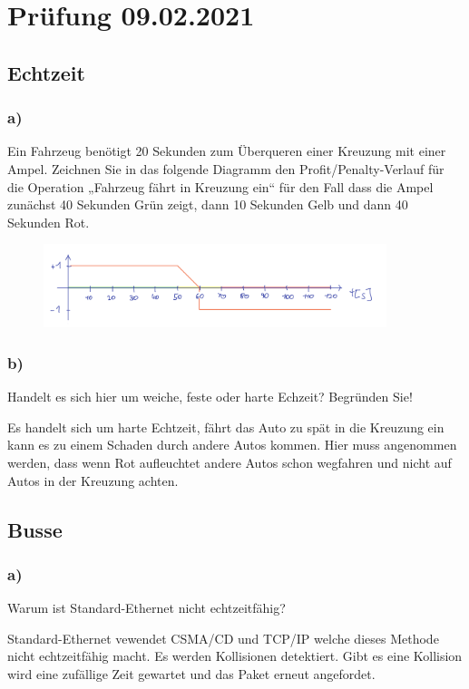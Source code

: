 \section{Prüfung 09.02.2021}
\subsection{Echtzeit}
\subsubsection{a)}
Ein Fahrzeug benötigt 20 Sekunden zum Überqueren einer Kreuzung mit einer Ampel. Zeichnen Sie in
das folgende Diagramm den Profit/Penalty-Verlauf für die Operation „Fahrzeug fährt in Kreuzung ein“
für den Fall dass die Ampel zunächst 40 Sekunden Grün zeigt, dann 10 Sekunden Gelb und dann 40
Sekunden Rot.

\begin{figure}[H]
  \includegraphics[width=10cm]{images/KA090221/1a.png}
  \centering
\end{figure}

\subsubsection{b)}
Handelt es sich hier um weiche, feste oder harte Echzeit? Begründen Sie!

Es handelt sich um harte Echtzeit, fährt das Auto zu spät in die Kreuzung ein kann es zu einem Schaden durch 
andere Autos kommen. Hier muss angenommen werden, dass wenn Rot aufleuchtet andere Autos schon wegfahren und 
nicht auf Autos in der Kreuzung achten.

\subsection{Busse}
\subsubsection{a)}
Warum ist Standard-Ethernet nicht echtzeitfähig?

Standard-Ethernet vewendet CSMA/CD und TCP/IP welche dieses Methode nicht echtzeitfähig macht. Es werden
Kollisionen detektiert. Gibt es eine Kollision wird eine zufällige Zeit gewartet und das Paket erneut angefordet.

